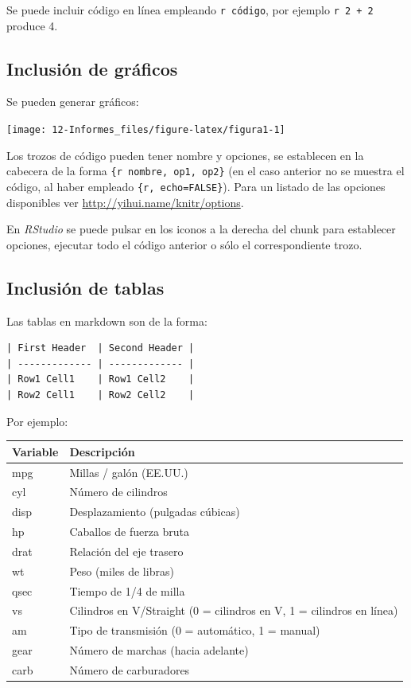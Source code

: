 \documentclass[]{book}
\begin{document}
Se puede incluir código en línea empleando \texttt{\textasciigrave{}r\ código\textasciigrave{}},
por ejemplo \texttt{\textasciigrave{}r\ 2\ +\ 2\textasciigrave{}} produce 4.

\hypertarget{inclusion-de-graficos}{%
\subsection{Inclusión de gráficos}\label{inclusion-de-graficos}}

Se pueden generar gráficos:

\begin{center}\texttt{[image: 12-Informes\_files/figure-latex/figura1-1]} \end{center}

Los trozos de código pueden tener nombre y opciones, se establecen en la cabecera de la forma
\texttt{\textasciigrave{}\textasciigrave{}\textasciigrave{}\{r\ nombre,\ op1,\ op2\}}
(en el caso anterior no se muestra el código, al haber empleado \texttt{\textasciigrave{}\textasciigrave{}\textasciigrave{}\{r,\ echo=FALSE\}}).
Para un listado de las opciones disponibles ver \url{http://yihui.name/knitr/options}.

En \emph{RStudio} se puede pulsar en los iconos a la derecha del chunk para establecer opciones,
ejecutar todo el código anterior o sólo el correspondiente trozo.

\hypertarget{inclusion-de-tablas}{%
\subsection{Inclusión de tablas}\label{inclusion-de-tablas}}

Las tablas en markdown son de la forma:

\begin{verbatim}
| First Header  | Second Header |
| ------------- | ------------- |
| Row1 Cell1    | Row1 Cell2    |
| Row2 Cell1    | Row2 Cell2    |
\end{verbatim}

Por ejemplo:

\begin{longtable}[]{@{}ll@{}}
\toprule
Variable & Descripción\tabularnewline
\midrule
\endhead
mpg & Millas / galón (EE.UU.)\tabularnewline
cyl & Número de cilindros\tabularnewline
disp & Desplazamiento (pulgadas cúbicas)\tabularnewline
hp & Caballos de fuerza bruta\tabularnewline
drat & Relación del eje trasero\tabularnewline
wt & Peso (miles de libras)\tabularnewline
qsec & Tiempo de 1/4 de milla\tabularnewline
vs & Cilindros en V/Straight (0 = cilindros en V, 1 = cilindros en línea)\tabularnewline
am & Tipo de transmisión (0 = automático, 1 = manual)\tabularnewline
gear & Número de marchas (hacia adelante)\tabularnewline
carb & Número de carburadores\tabularnewline
\bottomrule
\end{longtable}
\end{document}
